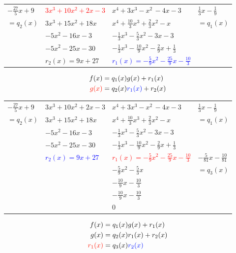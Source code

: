 \documentclass[13pt,fontset=mac]{ctexbeamer}
\newcommand{\blue}{\textcolor{blue}}
\newcommand{\red}{\textcolor{red}}
\begin{document}
\begin{frame}
	\begin{center}
				\renewcommand\arraystretch{1.3}
		\begin{tabular}{R{1.5cm}|R{3cm} |R{4cm}|L{1.7cm}}
$-\frac{27}{5}x+9$ &\red{$3x^3+10x^2+2x-3$}&{$x^4+3x^3-x^2\, -4x-3$}&$\frac{1}{3}x-\frac{1}{9}$\\
$=q_2(x)$ & $3x^3+15x^2+18x\quad $ & $x^4+\frac{10}{3}x^3+\frac{2}{3}x^2-x\qquad $& $=q_1(x)$\\
 &$ -5x^2-16x-3$ & $-\frac{1}{3}x^3-\frac{5}{3}x^2-3x-3\, $ & \\
  &$ -5x^2-25x-30$ & $-\frac{1}{3}x^3-\frac{10}{9}x^2-\frac{2}{9}x+\frac{1}{3}$ & \\
  &$ r_2(x) = 9x+27$ & \blue{$r_1(x) =-\frac{5}{9}x^2-\frac{25}{9}x-\frac{10}{3}$} &
		\end{tabular}
	\end{center}
	\pause

\begin{align*}
	{f(x)} & =q_1(x) {g(x)} +r_1(x)\\
\red{g(x)} & =q_2(x) \blue{r_1(x)} +r_2(x)
\end{align*}

\end{frame}




\begin{frame}
	\begin{center}
				\renewcommand\arraystretch{1.2}
		\begin{tabular}{R{1.5cm}|R{3cm} |R{4cm}|L{1.7cm}}
			$-\frac{27}{5}x+9$ &{$3x^3+10x^2+2x-3$}&{$x^4+3x^3-x^2\, -4x-3$}&$\frac{1}{3}x-\frac{1}{9}$\\
			$=q_2(x)$ & $3x^3+15x^2+18x\quad $ & $x^4+\frac{10}{3}x^3+\frac{2}{3}x^2-x\qquad $& $=q_1(x)$\\
			&$ -5x^2-16x-3$ & $-\frac{1}{3}x^3-\frac{5}{3}x^2-3x-3\, $ & \\
			&$ -5x^2-25x-30$ & $-\frac{1}{3}x^3-\frac{10}{9}x^2-\frac{2}{9}x+\frac{1}{3}$ & \\
			&\blue{$r_2(x) = 9x+27$} & \red{$r_1(x) =-\frac{5}{9}x^2-\frac{25}{9}x-\frac{10}{3}$} & $-\frac{5}{81}x-\frac{10}{81}$\\
			& & $-\frac{5}{9}x^2-\frac{5}{3}x$ & $=q_3(x)$\\
			& & $-\frac{10}{9}x-\frac{10}{3}$ & \\
			& & $-\frac{10}{9}x-\frac{10}{3}$ & \\
			& & 0 & \\
		\end{tabular}
	\end{center}

	\begin{align*}
		{f(x)} & =q_1(x) {g(x)} +r_1(x)\\
		{g(x)} & =q_2(x) {r_1(x)} +r_2(x)\\
		\red{r_1(x)} & = q_3(x) \blue{r_2(x)}
	\end{align*}



\end{frame}
\end{document}
